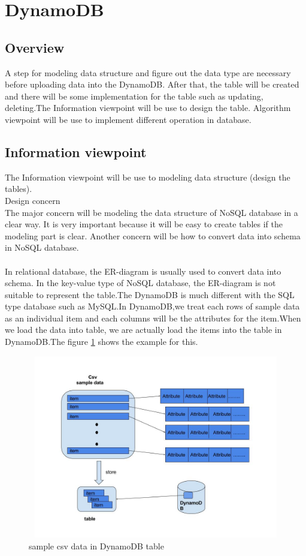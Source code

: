 \section{DynamoDB}
    \subsection{Overview}
    A step for modeling data structure and figure out the data type are necessary before uploading data into the DynamoDB. After that, the table will be created and there will be some implementation for the table such as updating, deleting.The Information viewpoint will be use to design the table. Algorithm viewpoint will be use to implement different operation in database.    
    
    \subsection{Information viewpoint}

    The Information viewpoint will be use to modeling data structure (design the tables).\\
Design concern \\
The major concern will be modeling the data structure of NoSQL database in a clear way. It is very important because it will be easy to create tables if the modeling part is clear. Another concern will be how to convert data into schema in NoSQL database.\\
\\
In relational database, the ER-diagram is usually used to convert data into schema. In the key-value type of NoSQL database, the ER-diagram is not suitable to represent the table.The DynamoDB is much different with the SQL type database such as MySQL.In DynamoDB,we treat each rows of sample data as an individual item and each columns will be the attributes for the item.When we load the data into table, we are actually load the items into the table in DynamoDB.The figure \ref{fig:1} shows the example for this.
\begin{figure}[h]
 \includegraphics[width=15cm, height=8cm]{11.jpg}
 \centering
 \caption{\label{fig:1}sample csv data in DynamoDB table}
 \end{figure}

